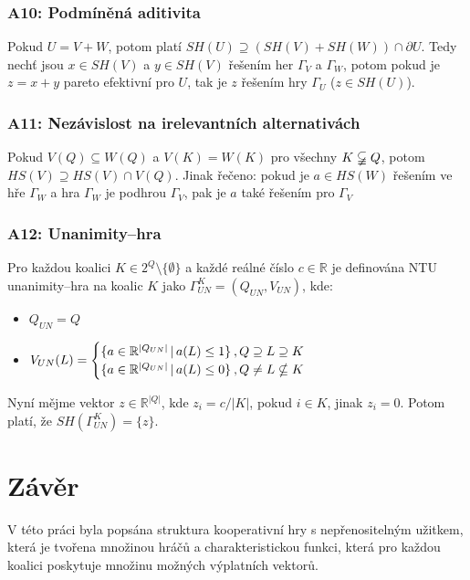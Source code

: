         \subsubsection*{A10: Podmíněná aditivita}
            Pokud $U = V + W$, potom platí $SH(U) \supseteq (SH(V) + SH(W)) \cap \partial U$. Tedy nechť jsou $x \in SH(V)$ a $y \in SH(V)$ řešením her $\Gamma_V$ a $\Gamma_W$, potom pokud je $z = x + y$ pareto efektivní pro $U$, tak je $z$ řešením hry $\Gamma_U$ ($z \in SH(U)$).
        \subsubsection*{A11: Nezávislost na irelevantních alternativách}
            Pokud $V(Q) \subseteq W(Q)$ a $V(K) = W(K)$ pro všechny $K \varsubsetneqq Q$, potom $HS(V) \supseteq HS(V) \cap V(Q)$. Jinak řečeno: pokud je $a \in HS(W)$ řešením ve hře $\Gamma_W$ a hra $\Gamma_W$ je podhrou $\Gamma_V$, pak je $a$ také řešením pro $\Gamma_V$
        \subsubsection*{A12: Unanimity--hra}
            Pro každou koalici $K \in 2^Q \setminus \{\emptyset\}$ a každé reálné číslo $c \in \mathbb{R}$ je definována NTU unanimity--hra na koalic $K$ jako $\Gamma^K_{UN} = (Q_{UN}, V_{UN})$, kde:
            \begin{itemize}
                \item $Q_{UN} = Q$
                \item $V_{UN}(L) = \begin{cases}
                    \{a \in \mathbb{R}^{|Q_{UN}|}\,|\,a(L) \leq 1\} & \hspace*{-0.8em},Q \supseteq L \supseteq K\\
                    \{a \in \mathbb{R}^{|Q_{UN}|}\,|\,a(L) \leq 0\} & \hspace*{-0.8em},Q \neq L \nsubseteq  K
                \end{cases}$
            \end{itemize}
            Nyní mějme vektor $z \in \mathbb{R}^{|Q|}$, kde $z_i = c/|K|$, pokud $i \in K$, jinak $z_i = 0$. Potom platí, že $SH(\Gamma^K_{UN}) = \{z\}$.

\section{Závěr}
    V této práci byla popsána struktura kooperativní hry s nepřenositelným užitkem, která je tvořena množinou hráčů a charakteristickou funkci, která pro každou koalici poskytuje množinu možných výplatních vektorů.

